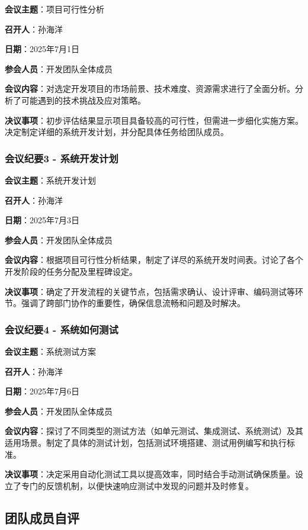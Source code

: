 \documentclass{base}
\numberwithin{figure}{section} %
\begin{document}
\textbf{会议主题}：项目可行性分析

\textbf{召开人}：孙海洋

\textbf{日期}：2025年7月1日

\textbf{参会人员}：开发团队全体成员

\textbf{会议内容}：对选定开发项目的市场前景、技术难度、资源需求进行了全面分析。分析了可能遇到的技术挑战及应对策略。

\textbf{决议事项}：初步评估结果显示项目具备较高的可行性，但需进一步细化实施方案。决定制定详细的系统开发计划，并分配具体任务给团队成员。

\subsubsection{会议纪要3 - 系统开发计划}

\textbf{会议主题}：系统开发计划

\textbf{召开人}：孙海洋

\textbf{日期}：2025年7月3日

\textbf{参会人员}：开发团队全体成员

\textbf{会议内容}：根据项目可行性分析结果，制定了详尽的系统开发时间表。讨论了各个开发阶段的任务分配及里程碑设定。

\textbf{决议事项}：确定了开发流程的关键节点，包括需求确认、设计评审、编码测试等环节。强调了跨部门协作的重要性，确保信息流畅和问题及时解决。

\subsubsection{会议纪要4 - 系统如何测试}

\textbf{会议主题}：系统测试方案

\textbf{召开人}：孙海洋

\textbf{日期}：2025年7月6日

\textbf{参会人员}：开发团队全体成员

\textbf{会议内容}：探讨了不同类型的测试方法（如单元测试、集成测试、系统测试）及其适用场景。制定了具体的测试计划，包括测试环境搭建、测试用例编写和执行标准。

\textbf{决议事项}：决定采用自动化测试工具以提高效率，同时结合手动测试确保质量。设立了专门的反馈机制，以便快速响应测试中发现的问题并及时修复。

\subsection{团队成员自评}
\end{document}
